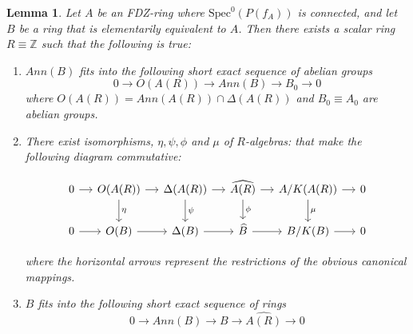 \documentclass{article}
\newtheorem{lemma}[theorem]{Lemma}
\theoremstyle{remark}
\def\Z{{\mathbb{Z}}}
\begin{document}
\begin{lemma}\label{lem:6term}
    Let $A$ be an FDZ-ring where $\text{Spec}^0(P(f_A))$ is connected, and let $B$ be a ring that is elementarily equivalent to $A$. Then there exists a scalar ring $R\equiv \Z$ such that the following is true:
    \begin{enumerate}
 \item  $Ann(B)$ fits into the following short exact sequence of abelian groups
    $$ 0\to O(A(R)) \to Ann(B)\to B_0\to 0$$
    where $O(A(R))=Ann(A(R))\cap \Delta(A(R))$ and $B_0\equiv A_0$ are abelian groups.
\item There exist isomorphisms, $\eta, \psi, \phi$ and $\mu$ of $R$-algebras: %
that make the following diagram commutative:

   
$$\begin{tikzcd}[column sep=small]
0 \arrow[r] & O(A(R)) \arrow[r] \arrow[d,"\eta"] &
\Delta(A(R)) \arrow[r] \arrow[d,"\psi"] &
\widehat{A(R)} \arrow[r] \arrow[d,"\phi"] &
A/K(A(R)) \arrow[r] \arrow[d,"\mu"] & 0 \\
0 \arrow[r] & O(B) \arrow[r] &
\Delta(B) \arrow[r] &
\widehat{B} \arrow[r] &
B/K(B) \arrow[r] & 0
\end{tikzcd}$$

where the horizontal arrows represent the restrictions of the obvious canonical mappings.
   \item $B$ fits into the following short exact sequence of rings
    $$0\to Ann(B) \to B \to \widehat{A(R)}\to 0$$ 

   
    \end{enumerate}
     
\end{lemma}
\end{document}
